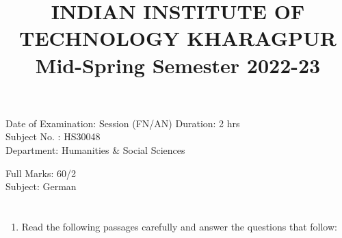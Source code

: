 \documentclass{article}
\title{
INDIAN INSTITUTE OF TECHNOLOGY KHARAGPUR
}
\title{
Mid-Spring Semester 2022-23
}
\date{}
\begin{document}
\maketitle

\noindent
Date of Examination: Session (FN/AN) Duration: 2 hrs \\
Subject No. : HS30048 \\
Department: Humanities \& Social Sciences

\noindent
Full Marks: 60/2 \\
Subject: German

\section*{}
\begin{enumerate}
    \item Read the following passages carefully and answer the questions that follow:


\end{enumerate}
\end{document}

